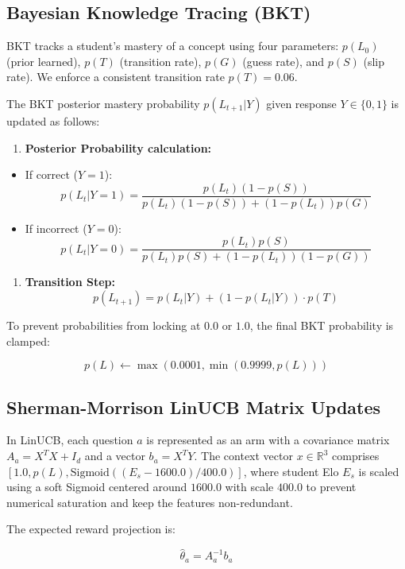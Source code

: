 \documentclass{article}
\begin{document}
\subsection{Bayesian Knowledge Tracing (BKT)}
BKT tracks a student's mastery of a concept using four parameters: $p(L_0)$ (prior learned), $p(T)$ (transition rate), $p(G)$ (guess rate), and $p(S)$ (slip rate). We enforce a consistent transition rate $p(T) = 0.06$.

The BKT posterior mastery probability $p(L_{t+1}|Y)$ given response $Y \in \{0, 1\}$ is updated as follows:

\begin{enumerate}
    \item \textbf{Posterior Probability calculation:}
\end{enumerate}
\begin{itemize}
    \item If correct ($Y = 1$):
     \[p(L_t|Y=1) = \frac{p(L_t)(1 - p(S))}{p(L_t)(1 - p(S)) + (1 - p(L_t))p(G)}\]
    \item If incorrect ($Y = 0$):
     \[p(L_t|Y=0) = \frac{p(L_t)p(S)}{p(L_t)p(S) + (1 - p(L_t))(1 - p(G))}\]
\end{itemize}

\begin{enumerate}
    \item \textbf{Transition Step:}
   \[p(L_{t+1}) = p(L_t|Y) + (1 - p(L_t|Y)) \cdot p(T)\]
\end{enumerate}

To prevent probabilities from locking at $0.0$ or $1.0$, the final BKT probability is clamped:

\[p(L) \leftarrow \max(0.0001, \min(0.9999, p(L)))\]

\subsection{Sherman-Morrison LinUCB Matrix Updates}
In LinUCB, each question $a$ is represented as an arm with a covariance matrix $A_a = X^T X + I_d$ and a vector $b_a = X^T Y$. The context vector $x \in \mathbb{R}^3$ comprises $[1.0, p(L), \text{Sigmoid}((E_s - 1600.0)/400.0)]$, where student Elo $E_s$ is scaled using a soft Sigmoid centered around $1600.0$ with scale $400.0$ to prevent numerical saturation and keep the features non-redundant.

The expected reward projection is:

\[\hat{\theta}_a = A_a^{-1} b_a\]
\end{document}
